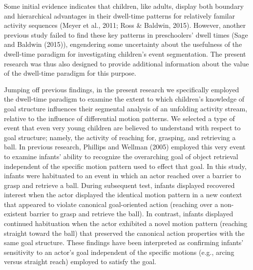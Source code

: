 \documentclass[
  english,
  man,floatsintext]{apa6}
\begin{document}
Some initial evidence indicates that children, like adults, display both boundary and hierarchical advantages in their dwell-time patterns for relatively familar activity sequences (Meyer et al., 2011; Ross \& Baldwin, 2015). However, another previous study failed to find these key patterns in preschoolers' dwell times (Sage and Baldwin (2015)), engendering some uncertainty about the usefulness of the dwell-time paradigm for investigating children's event segmentation. The present research was thus also designed to provide additional information about the value of the dwell-time paradigm for this purpose.

Jumping off previous findings, in the present research we specifically employed the dwell-time paradigm to examine the extent to which children's knowledge of goal structure influences their segmental analysis of an unfolding activity stream, relative to the influence of differential motion patterns. We selected a type of event that even very young children are believed to understand with respect to goal structure; namely, the activity of reaching for, grasping, and retrieving a ball. In previous research, Phillips and Wellman (2005) employed this very event to examine infants' ability to recognize the overarching goal of object retrieval independent of the specific motion pattern used to effect that goal. In this study, infants were habituated to an event in which an actor reached over a barrier to grasp and retrieve a ball. During subsequent test, infants displayed recovered interest when the actor displayed the identical motion pattern in a new context that appeared to violate canonical goal-oriented action (reaching over a non-existent barrier to grasp and retrieve the ball). In contrast, infants displayed continued habituation when the actor exhibited a novel motion pattern (reaching straight toward the ball) that preserved the canonical action properties with the same goal structure. These findings have been interpreted as confirming infants' sensitivity to an actor's goal independent of the specific motions (e.g., arcing versus straight reach) employed to satisfy the goal.
\end{document}
